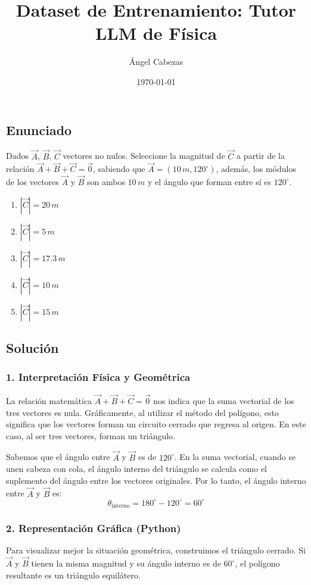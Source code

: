 \documentclass[12pt, a4paper]{article}
\title{Dataset de Entrenamiento: Tutor LLM de Física}
\author{Ángel Cabezas}
\date{\today}
\begin{document}
\maketitle

\subsection*{Enunciado}
Dados $\vec{A}$, $\vec{B}$, $\vec{C}$ vectores no nulos. Seleccione la magnitud de $\vec{C}$ a partir de la relación $\vec{A} + \vec{B} + \vec{C} = \vec{0}$, sabiendo que $\vec{A} = (10 \, \si{m}, 120^\circ)$, además, los módulos de los vectores $\vec{A}$ y $\vec{B}$ son ambos $10 \, \si{m}$ y el ángulo que forman entre sí es $120^\circ$.

\begin{enumerate}[label=\alph*)]
    \item $|\vec{C}| = 20 \, \si{m}$
    \item $|\vec{C}| = 5 \, \si{m}$
    \item $|\vec{C}| = 17.3 \, \si{m}$
    \item $|\vec{C}| = 10 \, \si{m}$
    \item $|\vec{C}| = 15 \, \si{m}$
\end{enumerate}

\subsection*{Solución}

\subsubsection*{1. Interpretación Física y Geométrica}
La relación matemática $\vec{A} + \vec{B} + \vec{C} = \vec{0}$ nos indica que la suma vectorial de los tres vectores es nula. Gráficamente, al utilizar el método del polígono, esto significa que los vectores forman un circuito cerrado que regresa al origen. En este caso, al ser tres vectores, forman un triángulo.

Sabemos que el ángulo entre $\vec{A}$ y $\vec{B}$ es de $120^\circ$. En la suma vectorial, cuando se unen cabeza con cola, el ángulo interno del triángulo se calcula como el suplemento del ángulo entre los vectores originales. 
Por lo tanto, el ángulo interno entre $\vec{A}$ y $\vec{B}$ es:
$$\theta_{\text{interno}} = 180^\circ - 120^\circ = 60^\circ$$

\subsubsection*{2. Representación Gráfica (Python)}
Para visualizar mejor la situación geométrica, construimos el triángulo cerrado. Si $\vec{A}$ y $\vec{B}$ tienen la misma magnitud y su ángulo interno es de $60^\circ$, el polígono resultante es un triángulo equilátero.
\end{document}
